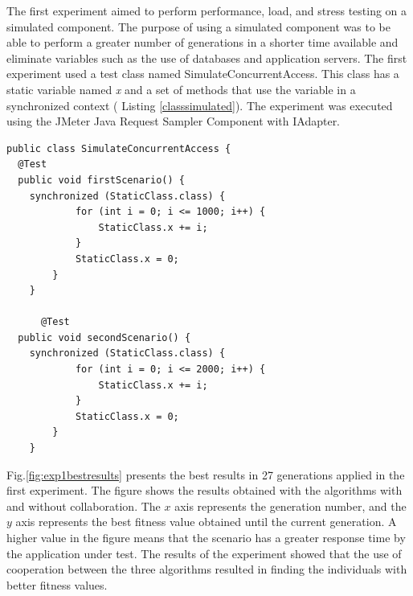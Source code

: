 \documentclass{report}
\begin{document}
The first experiment aimed to perform performance, load, and stress testing on a simulated component. The purpose of using a simulated component was to be able to perform a greater number of generations in a shorter time available and eliminate variables such as the use of databases and application servers. The first experiment used a test class  named SimulateConcurrentAccess. This class has a static variable named \textit{x} and a set of methods that use the variable in a synchronized context ( Listing \ref{classsimulated}). The experiment was executed using the JMeter Java Request Sampler Component with IAdapter.


\begin{lstlisting}[style=outline,caption={SimulateConcurrentAccess class},float,label=classsimulated]
public class SimulateConcurrentAccess {
  @Test
  public void firstScenario() {		
    synchronized (StaticClass.class) {
			for (int i = 0; i <= 1000; i++) {
				StaticClass.x += i;
			}
			StaticClass.x = 0;
		}
	}
	
	  @Test
  public void secondScenario() {		
    synchronized (StaticClass.class) {
			for (int i = 0; i <= 2000; i++) {
				StaticClass.x += i;
			}
			StaticClass.x = 0;
		}
	}
\end{lstlisting}


Fig.\ref{fig:exp1bestresults} presents the best results in 27 generations applied in the first experiment. The figure shows the results obtained with the algorithms with and without collaboration. The $x$ axis  represents the generation number, and the $y$ axis represents the best fitness value obtained until the current generation.
A higher value in the figure means that the scenario has a greater response time by the application under test. The results of the experiment showed that the use of cooperation between the three algorithms resulted in finding the individuals with better fitness values.
\end{document}
